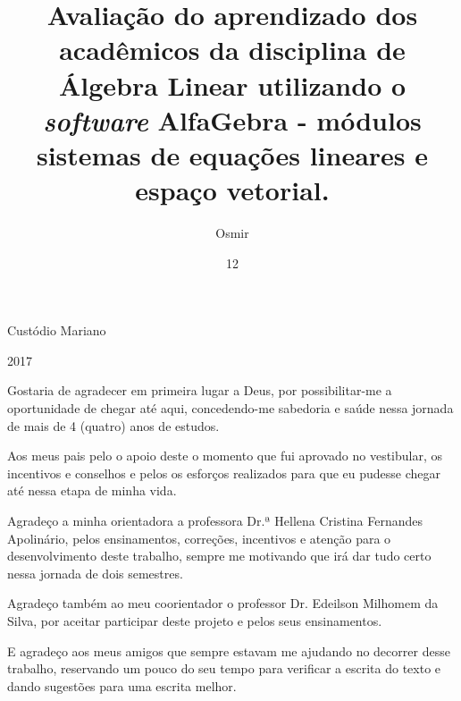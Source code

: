 \documentclass[tcc1]{uftex}
\begin{document}
  \title{Avaliação do aprendizado dos acadêmicos da disciplina de Álgebra Linear utilizando o \textit{software} AlfaGebra - módulos sistemas de equações lineares e espaço vetorial.}
  \author{Osmir}{Custódio Mariano}
  
  \date{12}{2017}



  \maketitle

 \frontmatter
 \dedication{Dedico este trabalho aos meus pais, Orlando Mariano da Silva e Maria Gorete Ramos Custódio, que não mediram esforços para que eu chegasse até aqui.}

  \begin{acknowledgement}
  Gostaria de agradecer em primeira lugar a Deus, por possibilitar-me a oportunidade de chegar até aqui, concedendo-me sabedoria e saúde nessa jornada de mais de 4 (quatro) anos de estudos.
  
  Aos meus pais pelo o apoio deste o momento que fui aprovado no vestibular, os incentivos e conselhos e pelos os esforços realizados para que eu pudesse chegar até nessa etapa de minha vida.
  
  Agradeço a minha orientadora a professora Dr.ª Hellena Cristina Fernandes Apolinário, pelos ensinamentos, correções, incentivos e atenção para o desenvolvimento deste trabalho, sempre me motivando que irá dar tudo certo nessa jornada de dois semestres.
  
  Agradeço também ao meu coorientador o professor Dr. Edeilson Milhomem da Silva, por aceitar participar deste projeto e pelos seus ensinamentos.
  
  E agradeço aos meus amigos que sempre estavam me ajudando no decorrer desse trabalho, reservando um pouco do seu tempo para verificar a escrita do texto e dando sugestões para uma escrita melhor.
  
  \end{acknowledgement}
\end{document}
